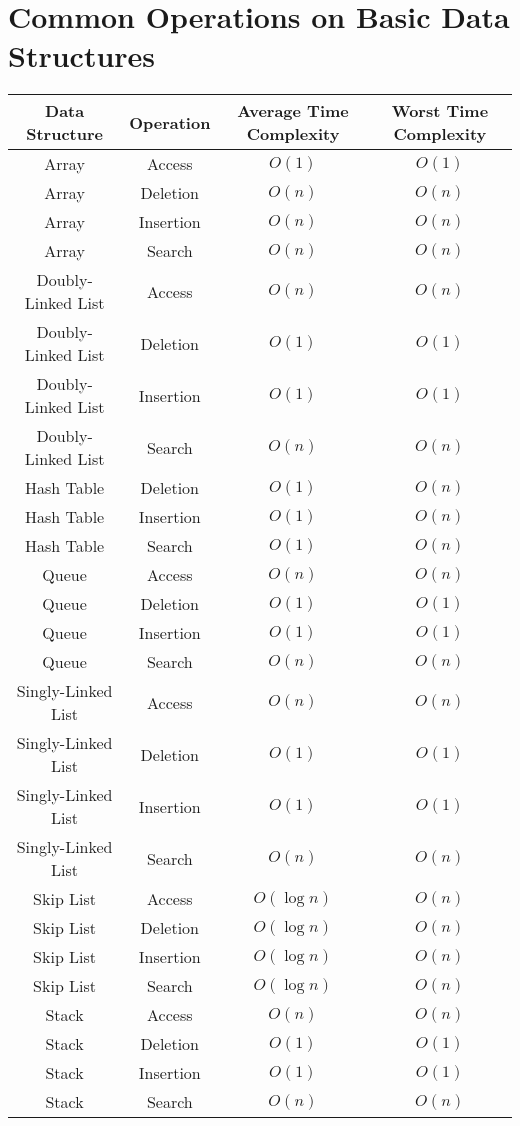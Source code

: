 \documentclass{article}
\begin{document}

\newpage
\section*{Common Operations on Basic Data Structures}

\begin{table}[ht]
	\centering
	\scriptsize
	\begin{tabular}{c ccc}
		Data Structure & Operation & Average Time Complexity & Worst Time Complexity \\
		\hline
		Array & Access & $O(1)$ & $O(1)$  \\
		Array & Deletion & $O(n)$ & $O(n)$  \\
		Array & Insertion & $O(n)$ & $O(n)$  \\
		Array & Search & $O(n)$ & $O(n)$ \\
		Doubly-Linked List & Access & $O(n)$ & $O(n)$  \\
		Doubly-Linked List & Deletion & $O(1)$ & $O(1)$  \\
		Doubly-Linked List & Insertion & $O(1)$ & $O(1)$  \\
		Doubly-Linked List & Search & $O(n)$ & $O(n)$ \\
		Hash Table & Deletion & $O(1)$ & $O(n)$ \\
		Hash Table & Insertion & $O(1)$ & $O(n)$ \\
		Hash Table & Search & $O(1)$ & $O(n)$ \\
		Queue & Access & $O(n)$ & $O(n)$  \\
		Queue & Deletion & $O(1)$ & $O(1)$  \\
		Queue & Insertion & $O(1)$ & $O(1)$  \\
		Queue& Search & $O(n)$ & $O(n)$  \\
		Singly-Linked List & Access & $O(n)$ & $O(n)$  \\
		Singly-Linked List & Deletion & $O(1)$ & $O(1)$ \\
		Singly-Linked List & Insertion & $O(1)$ & $O(1)$ \\
		Singly-Linked List & Search & $O(n)$ & $O(n)$ \\
		Skip List & Access & $O(\log{n})$ & $O(n)$ \\
		Skip List & Deletion & $O(\log{n})$ & $O(n)$ \\
		Skip List & Insertion & $O(\log{n})$ & $O(n)$ \\
		Skip List & Search & $O(\log{n})$ & $O(n)$ \\
		Stack & Access & $O(n)$ & $O(n)$ \\
		Stack & Deletion & $O(1)$ & $O(1)$ \\
		Stack & Insertion & $O(1)$ & $O(1)$ \\
		Stack & Search & $O(n)$ & $O(n)$ \\
		\hline
	\end{tabular}
\end{table}
\end{document}
